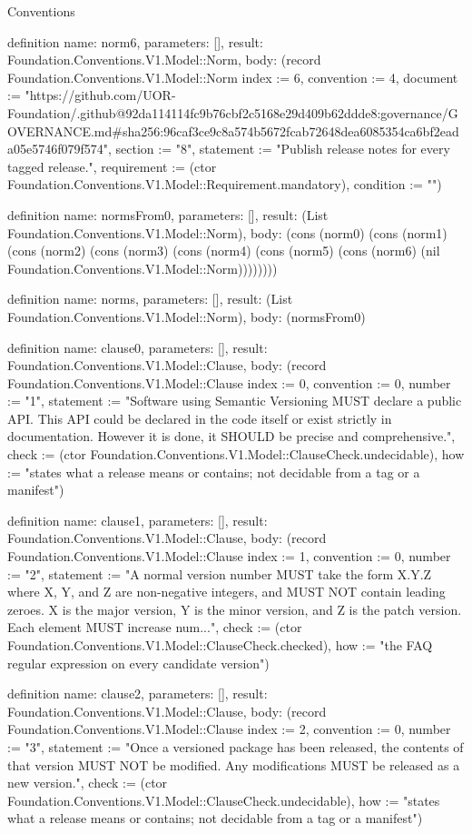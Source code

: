 \begin{lexlean}{Conventions}
\begin{semanticmodule}
definition{
  name: norm6,
  parameters: [],
  result: Foundation.Conventions.V1.Model::Norm,
  body: (record Foundation.Conventions.V1.Model::Norm {index := 6, convention := 4, document := "https://github.com/UOR-Foundation/.github@92da114114fc9b76cbf2c5168e29d409b62ddde8:governance/GOVERNANCE.md#sha256:96caf3ce9c8a574b5672fcab72648dea6085354ca6bf2eada05e5746f079f574", section := "8", statement := "Publish release notes for every tagged release.", requirement := (ctor Foundation.Conventions.V1.Model::Requirement.mandatory), condition := ""})
}

definition{
  name: normsFrom0,
  parameters: [],
  result: (List Foundation.Conventions.V1.Model::Norm),
  body: (cons (norm0) (cons (norm1) (cons (norm2) (cons (norm3) (cons (norm4) (cons (norm5) (cons (norm6) (nil Foundation.Conventions.V1.Model::Norm))))))))
}

definition{
  name: norms,
  parameters: [],
  result: (List Foundation.Conventions.V1.Model::Norm),
  body: (normsFrom0)
}

definition{
  name: clause0,
  parameters: [],
  result: Foundation.Conventions.V1.Model::Clause,
  body: (record Foundation.Conventions.V1.Model::Clause {index := 0, convention := 0, number := "1", statement := "Software using Semantic Versioning MUST declare a public API. This API could be declared in the code itself or exist strictly in documentation. However it is done, it SHOULD be precise and comprehensive.", check := (ctor Foundation.Conventions.V1.Model::ClauseCheck.undecidable), how := "states what a release means or contains; not decidable from a tag or a manifest"})
}

definition{
  name: clause1,
  parameters: [],
  result: Foundation.Conventions.V1.Model::Clause,
  body: (record Foundation.Conventions.V1.Model::Clause {index := 1, convention := 0, number := "2", statement := "A normal version number MUST take the form X.Y.Z where X, Y, and Z are non-negative integers, and MUST NOT contain leading zeroes. X is the major version, Y is the minor version, and Z is the patch version. Each element MUST increase num...", check := (ctor Foundation.Conventions.V1.Model::ClauseCheck.checked), how := "the FAQ regular expression on every candidate version"})
}

definition{
  name: clause2,
  parameters: [],
  result: Foundation.Conventions.V1.Model::Clause,
  body: (record Foundation.Conventions.V1.Model::Clause {index := 2, convention := 0, number := "3", statement := "Once a versioned package has been released, the contents of that version MUST NOT be modified. Any modifications MUST be released as a new version.", check := (ctor Foundation.Conventions.V1.Model::ClauseCheck.undecidable), how := "states what a release means or contains; not decidable from a tag or a manifest"})
}


\end{semanticmodule}
\end{lexlean}
